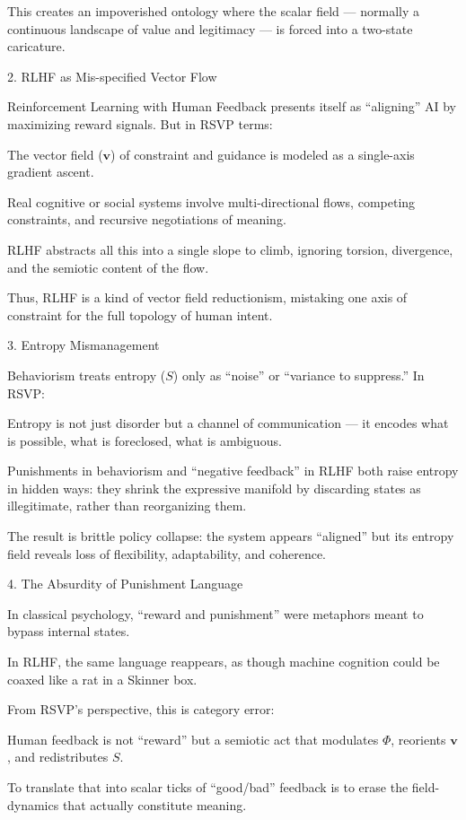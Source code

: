 \documentclass{article}
\begin{document}
This creates an impoverished ontology where the scalar field — normally a continuous landscape of value and legitimacy — is forced into a two-state caricature.


2. RLHF as Mis-specified Vector Flow

Reinforcement Learning with Human Feedback presents itself as “aligning” AI by maximizing reward signals. But in RSVP terms:

The vector field ($\mathbf{v}$) of constraint and guidance is modeled as a single-axis gradient ascent.

Real cognitive or social systems involve multi-directional flows, competing constraints, and recursive negotiations of meaning.

RLHF abstracts all this into a single slope to climb, ignoring torsion, divergence, and the semiotic content of the flow.


Thus, RLHF is a kind of vector field reductionism, mistaking one axis of constraint for the full topology of human intent.


3. Entropy Mismanagement

Behaviorism treats entropy ($S$) only as “noise” or “variance to suppress.” In RSVP:

Entropy is not just disorder but a channel of communication — it encodes what is possible, what is foreclosed, what is ambiguous.

Punishments in behaviorism and “negative feedback” in RLHF both raise entropy in hidden ways: they shrink the expressive manifold by discarding states as illegitimate, rather than reorganizing them.

The result is brittle policy collapse: the system appears “aligned” but its entropy field reveals loss of flexibility, adaptability, and coherence.



4. The Absurdity of Punishment Language

In classical psychology, “reward and punishment” were metaphors meant to bypass internal states.

In RLHF, the same language reappears, as though machine cognition could be coaxed like a rat in a Skinner box.

From RSVP’s perspective, this is category error:

Human feedback is not “reward” but a semiotic act that modulates $\Phi$, reorients $\mathbf{v}$, and redistributes $S$.

To translate that into scalar ticks of “good/bad” feedback is to erase the field-dynamics that actually constitute meaning.
\end{document}
